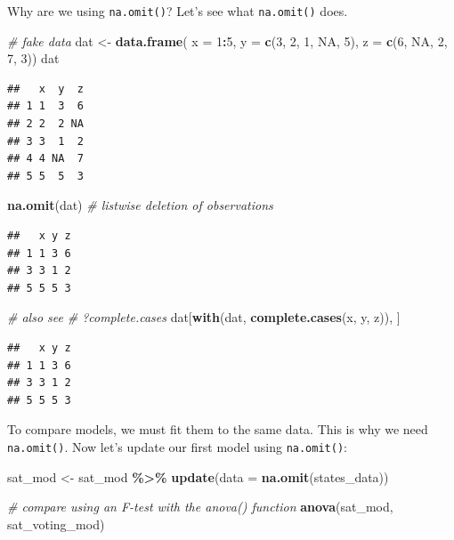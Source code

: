 \documentclass[
]{book}
\newenvironment{Shaded}{\begin{snugshade}}{\end{snugshade}}
\newcommand{\CommentTok}[1]{\textcolor[rgb]{0.56,0.35,0.01}{\textit{#1}}}
\newcommand{\DataTypeTok}[1]{\textcolor[rgb]{0.13,0.29,0.53}{#1}}
\newcommand{\DecValTok}[1]{\textcolor[rgb]{0.00,0.00,0.81}{#1}}
\newcommand{\KeywordTok}[1]{\textcolor[rgb]{0.13,0.29,0.53}{\textbf{#1}}}
\newcommand{\NormalTok}[1]{#1}
\newcommand{\OperatorTok}[1]{\textcolor[rgb]{0.81,0.36,0.00}{\textbf{#1}}}
\newcommand{\OtherTok}[1]{\textcolor[rgb]{0.56,0.35,0.01}{#1}}
\newcommand{\StringTok}[1]{\textcolor[rgb]{0.31,0.60,0.02}{#1}}
\begin{document}
Why are we using \texttt{na.omit()}? Let's see what \texttt{na.omit()} does.

\begin{Shaded}
\begin{Highlighting}[]
\CommentTok{\# fake data}
\NormalTok{dat \textless{}{-}}\StringTok{ }\KeywordTok{data.frame}\NormalTok{(}
  \DataTypeTok{x =} \DecValTok{1}\OperatorTok{:}\DecValTok{5}\NormalTok{,}
  \DataTypeTok{y =} \KeywordTok{c}\NormalTok{(}\DecValTok{3}\NormalTok{, }\DecValTok{2}\NormalTok{, }\DecValTok{1}\NormalTok{, }\OtherTok{NA}\NormalTok{, }\DecValTok{5}\NormalTok{),}
  \DataTypeTok{z =} \KeywordTok{c}\NormalTok{(}\DecValTok{6}\NormalTok{, }\OtherTok{NA}\NormalTok{, }\DecValTok{2}\NormalTok{, }\DecValTok{7}\NormalTok{, }\DecValTok{3}\NormalTok{))}
\NormalTok{dat}
\end{Highlighting}
\end{Shaded}

\begin{verbatim}
##   x  y  z
## 1 1  3  6
## 2 2  2 NA
## 3 3  1  2
## 4 4 NA  7
## 5 5  5  3
\end{verbatim}

\begin{Shaded}
\begin{Highlighting}[]
\KeywordTok{na.omit}\NormalTok{(dat) }\CommentTok{\# listwise deletion of observations}
\end{Highlighting}
\end{Shaded}

\begin{verbatim}
##   x y z
## 1 1 3 6
## 3 3 1 2
## 5 5 5 3
\end{verbatim}

\begin{Shaded}
\begin{Highlighting}[]
\CommentTok{\# also see}
\CommentTok{\# ?complete.cases}
\NormalTok{dat[}\KeywordTok{with}\NormalTok{(dat, }\KeywordTok{complete.cases}\NormalTok{(x, y, z)), ]}
\end{Highlighting}
\end{Shaded}

\begin{verbatim}
##   x y z
## 1 1 3 6
## 3 3 1 2
## 5 5 5 3
\end{verbatim}

To compare models, we must fit them to the same data. This is why we need \texttt{na.omit()}.
Now let's update our first model using \texttt{na.omit()}:

\begin{Shaded}
\begin{Highlighting}[]
\NormalTok{  sat\_mod \textless{}{-}}\StringTok{ }
\StringTok{      }\NormalTok{sat\_mod }\OperatorTok{\%\textgreater{}\%}
\StringTok{      }\KeywordTok{update}\NormalTok{(}\DataTypeTok{data =} \KeywordTok{na.omit}\NormalTok{(states\_data))}

  \CommentTok{\# compare using an F{-}test with the anova() function}
  \KeywordTok{anova}\NormalTok{(sat\_mod, sat\_voting\_mod)}
\end{Highlighting}
\end{Shaded}
\end{document}
